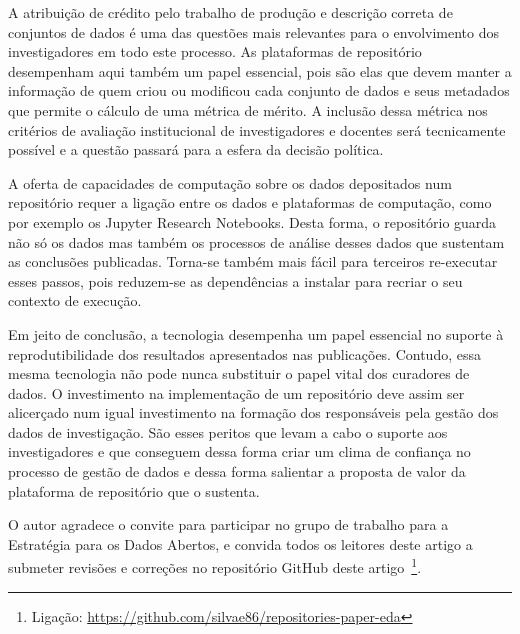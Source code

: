 \documentclass[sigconf,nonacm]{acmart}
\begin{document}
A atribuição de crédito pelo trabalho de produção e descrição correta de conjuntos de dados é uma das questões mais relevantes para o envolvimento dos investigadores em todo este processo. As plataformas de repositório desempenham aqui também um papel essencial, pois são elas que devem manter a informação de quem criou ou modificou cada conjunto de dados e seus metadados que permite o cálculo de uma métrica de mérito. A inclusão dessa métrica nos critérios de avaliação institucional de investigadores e docentes será tecnicamente possível e a questão passará para a esfera da decisão política.

A oferta de capacidades de computação sobre os dados depositados num repositório requer a ligação entre os dados e plataformas de computação, como por exemplo os Jupyter Research Notebooks. Desta forma, o repositório guarda não só os dados mas também os processos de análise desses dados que sustentam as conclusões publicadas. Torna-se também mais fácil para terceiros re-executar esses passos, pois reduzem-se as dependências a instalar para recriar o seu contexto de execução.

Em jeito de conclusão, a tecnologia desempenha um papel essencial no suporte à reprodutibilidade dos resultados apresentados nas publicações. Contudo, essa mesma tecnologia não pode nunca substituir o papel vital dos curadores de dados. O investimento na implementação de um repositório deve assim ser alicerçado num igual investimento na formação dos responsáveis pela gestão dos dados de investigação. São esses peritos que levam a cabo o suporte aos investigadores e que conseguem dessa forma criar um clima de confiança no processo de gestão de dados e dessa forma salientar a proposta de valor da plataforma de repositório que o sustenta.


\begin{acks}
O autor agradece o convite para participar no grupo de trabalho para a Estratégia para os Dados Abertos, e convida todos os leitores deste artigo a submeter revisões e correções no repositório GitHub deste artigo~\footnote{Ligação: \url{https://github.com/silvae86/repositories-paper-eda}}.
\end{acks}





\printglossary[type=\acronymtype]
\printglossary
\end{document}

